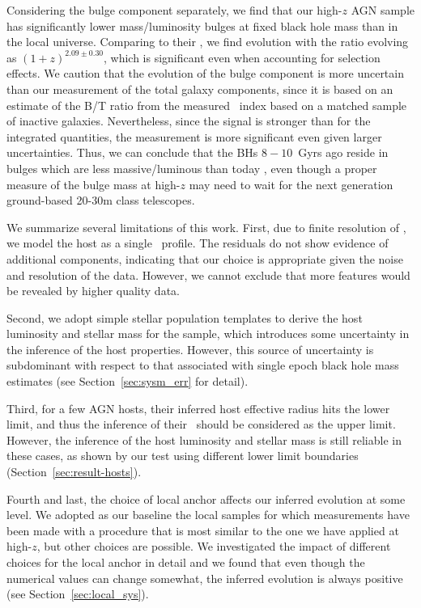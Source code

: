 \documentclass[apj]{emulateapj}
\begin{document}
Considering the bulge component \citep{Bennert11, Woo++08} separately, we find that our high-$z$ AGN sample has significantly lower mass/luminosity bulges at fixed black hole mass than in the local universe. Comparing to their \mbh, we find evolution with the ratio evolving as $(1+z)^{2.09\pm0.30}$, which is significant even when accounting for selection effects. We caution that the evolution of the bulge component is more uncertain than our measurement of the total galaxy components, since it is based on an estimate of the B/T ratio from the measured \sersic\ index based on a matched sample of inactive galaxies. Nevertheless, since the signal is stronger than for the integrated quantities, the measurement is more significant even given larger uncertainties.
Thus, we can conclude that the BHs $8-10$~Gyrs ago reside in bulges which are less massive/luminous than today \citep[see also][]{Bennert11,Park15}, even though a proper measure of the bulge mass at high-$z$ may need to wait for the next generation ground-based 20-30m class telescopes.

We summarize several limitations of this work. First, due to finite resolution of \hst, we model the host as a single \sersic\ profile. The residuals do not show evidence of additional components, indicating that our choice is appropriate given the noise and resolution of the data. However, we cannot exclude that more features would be revealed by higher quality data.

Second, we adopt simple stellar population templates to derive the host luminosity and stellar mass for the sample, which introduces some uncertainty in the inference of the host properties. However, this source of uncertainty is subdominant with respect to that associated with single epoch black hole mass estimates (see Section~\ref{sec:sysm_err} for detail). 

Third, for a few AGN hosts, their inferred host effective radius hits the lower limit, and thus the inference of their \Reff\ should be considered as the upper limit. However, the inference of the host luminosity and stellar mass is still reliable in these cases, as shown by our test using different lower limit boundaries (Section~\ref{sec:result-hosts}). 

Fourth and last, the choice of local anchor affects our inferred evolution at some level.  We adopted as our baseline the local samples for which measurements have been made with a procedure that is most similar to the one we have applied at high-$z$, but other choices are possible. We investigated the impact of different choices for the local anchor in detail and we found that even though the numerical values can change somewhat, the inferred evolution is always positive  (see Section~\ref{sec:local_sys}).
\end{document}
